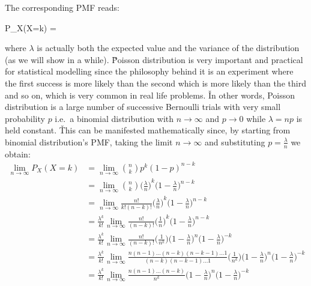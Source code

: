 The corresponding PMF reads:

\bse
P_{X}(X=k) = 
\ese
\ed

where $\lambda$ is actually both the expected value and the variance of the distribution (as we will show in a while).
\v

Poisson distribution is very important and practical for statistical modelling since the philosophy behind it is an
experiment where the first success is more likely than the second which is more likely than the third and so on,
which is very common in real life problems. \v

In other words, Poisson distribution is a large number of successive Bernoulli trials with very small probability $p$
i.e.\ a binomial distribution with $n \to \infty$ and $p \to 0$ while $\lambda = n p$ is held constant. \v

This can be manifested mathematically since, by starting from binomial distribution's PMF, taking the limit $n \to
\infty$ and substituting $p = \frac{\lambda}{n}$ we obtain:
\begingroup
\allowdisplaybreaks
{\setlength{\jot}{10pt}
\begin{align*}
\lim_{n\to\infty} P_{X}(X=k) &= \lim_{n\to\infty} \binom{n}{k}p^{k} (1-p)^{n-k} \\
&= \lim_{n\to\infty} \binom{n}{k}{\Big( \frac{\lambda}{n} \Big)}^{k} \Big(1-\frac{\lambda}{n} \Big)^{n-k} \\
&= \lim_{n\to\infty} \frac{n!}{k!(n-k)!}{ \Big( \frac{\lambda}{n} \Big)}^{k} \Big( 1-\frac{\lambda}{n} \Big)^{n-k} \\
&= \frac{\lambda^k}{k!} \lim_{n\to\infty} \frac{n!}{(n-k)!}{ \Big(\frac{1}{n} \Big)}^{k}
\Big(1-\frac{\lambda}{n} \Big)^{n-k} \\
&= \frac{\lambda^k}{k!} \lim_{n\to\infty} \frac{n!}{(n-k)!}{\Big(\frac{1}{n^{k}} \Big)}
\Big(1-\frac{\lambda}{n} \Big)^{n} \Big( 1-\frac{\lambda}{n} \Big)^{-k} \\
&= \frac{\lambda^k}{k!} \lim_{n\to\infty} \frac{n (n-1) \ldots (n-k)(n-k-1) \ldots 1}{(n-k) (n-k-1) \ldots 1}
{\Big( \frac{1}{n^{k}} \Big)} \Big( 1-\frac{\lambda}{n} \Big)^{n} \Big( 1-\frac{\lambda}{n} \Big)^{-k} \\
&= \frac{\lambda^k}{k!} \lim_{n\to\infty} \frac{n (n-1) \ldots (n-k)}{n^{k}} \Big( 1-\frac{\lambda}{n} \Big)^{n}
\Big(1-\frac{\lambda}{n} \Big)^{-k}
\end{align*}}
\endgroup

